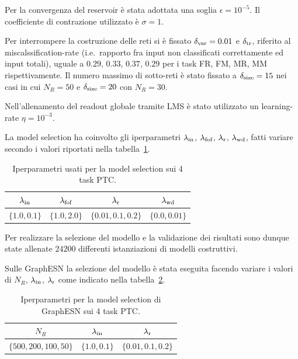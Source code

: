 Per la convergenza del reservoir è stata adottata una soglia $\epsilon = 10^{-5}$. Il coefficiente di contrazione utilizzato è $\sigma = 1$.

Per interrompere la costruzione delle reti si è fissato $\delta_\textup{var} = 0.01$ e $\delta_\textup{tr}$, riferito al miscalssification-rate (i.e.\ rapporto fra input non classificati correttamente ed input totali), uguale a $0.29$, $0.33$, $0.37$,  $0.29$ per i task FR, FM, MR, MM rispettivamente. Il numero massimo di sotto-reti è stato fissato a $\delta_\textup{size} = 15$ nei casi in cui $N_R = 50$ e $\delta_\textup{size} = 20$ con $N_R = 30$.

Nell'allenamento del readout globale tramite LMS è stato utilizzato un learning-rate $\eta = 10^{-3}$.

La model selection ha coinvolto gli iperparametri $\lambda_\textup{in}$, $\lambda_\textup{fof}$, $\lambda_\textup{r}$, $\lambda_\textup{wd}$, fatti variare secondo i valori riportati nella tabella~\ref{tab:esperimenti:grigliaPTC}.
\begin{table}[tbp]
\small
\caption[Model selection: iperparametri per PTC]{Iperparametri usati per la model selection sui 4 task PTC.}
\label{tab:esperimenti:grigliaPTC}
\centering
\begin{tabular}{*{4}{c}}
\toprule
$\lambda_\textup{in}$ & $\lambda_\textup{fof}$ & $\lambda_\textup{r}$ & $\lambda_\textup{wd}$ \\
\midrule
$\lbrace 1.0, 0.1 \rbrace$ & $\lbrace 1.0, 2.0 \rbrace$ & $\lbrace 0.01, 0.1, 0.2 \rbrace$ & $\lbrace 0.0, 0.01 \rbrace$ \\
\bottomrule
\end{tabular}
\end{table}
Per realizzare la selezione del modello e la validazione dei risultati sono dunque state allenate $24200$ differenti istanziazioni di modelli costruttivi.

Sulle GraphESN la selezione del modello è stata eseguita facendo variare i valori di $N_R$, $\lambda_\textup{in}$, $\lambda_\textup{r}$ come indicato nella tabella~\ref{tab:esperimenti:grigliaPTCstandard}.
\begin{table}[tbp]
\small
\caption[Model selection: iperparametri per GraphESN su PTC]{Iperparametri per la model selection di GraphESN sui 4 task PTC.}
\label{tab:esperimenti:grigliaPTCstandard}
\centering
\begin{tabular}{*{3}{c}}
\toprule
$N_R$ & $\lambda_\textup{in}$ & $\lambda_\textup{r}$ \\
\midrule
$\lbrace 500, 200, 100, 50 \rbrace$ & $\lbrace 1.0, 0.1 \rbrace$ & $\lbrace 0.01, 0.1, 0.2 \rbrace$ \\
\bottomrule
\end{tabular}
\end{table}

